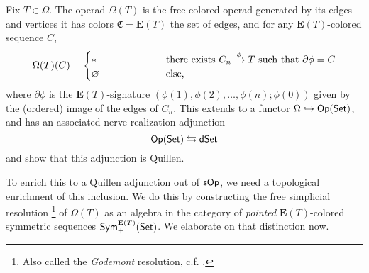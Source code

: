 \documentclass[a4paper,10pt
,draft
]{article}%
\renewcommand{\1}{\eta}%
\begin{document}
\begin{definition}
      Fix $T \in \Omega$.
      The operad $\Omega(T)$ is the free colored operad generated by its edges and vertices
      it has colors $\mathfrak C = \mathbf E(T)$ the set of edges, and
      for any $\mathbf E(T)$-colored sequence $C$, 
      \begin{equation}
            \Omega(T)(C) =
            \begin{cases}
                  \** \qquad \qquad \qquad & \mbox{there exists $C_n \xrightarrow{\phi} T$ such that $\partial \phi = C$}
                  \\
                  \varnothing & \text{else,}
            \end{cases}
      \end{equation}
      where $\partial \phi$ is the $\mathbf E(T)$-signature $(\phi(1), \phi(2), \dots, \phi(n); \phi(0))$
      given by the (ordered) image of the edges of $C_n$.
      This extends to a functor $\Omega \hookrightarrow \mathsf{Op}(\mathsf{Set})$, and has an associated nerve-realization adjunction
      \[
            \mathsf{Op}(\mathsf{Set}) \leftrightarrows \mathsf{dSet}
      \]
      and \cite[Prop. 2.5]{CM11} show that this adjunction is Quillen.
\end{definition}

To enrich this to a Quillen adjunction out of $\mathsf{sOp}$, we need a topological enrichment of this inclusion.
We do this by constructing the free simplicial resolution \footnote{
  Also called the \textit{Godemont} resolution, c.f. \cite[\S 8.3]{BM06}.}
of $\Omega(T)$ as an algebra in the category of \textit{pointed} $\mathbf E(T)$-colored symmetric sequences $\mathsf{Sym}^{\mathbf E(T)}_{+}(\mathsf{Set})$.
We elaborate on that distinction now.
\end{document}
